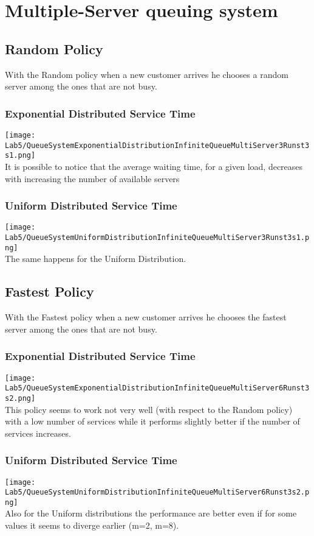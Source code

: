 \documentclass[twocolumn,letterpaper]{report}
\begin{document}
{	 			
	 			\section{Multiple-Server queuing system}
	 			\subsection{Random Policy}
	 			With the Random policy when a new customer arrives he chooses a random server among the ones that are not busy.
			 			\subsubsection{Exponential Distributed Service Time}
			 			\texttt{[image: Lab5/QueueSystemExponentialDistributionInfiniteQueueMultiServer3Runst3s1.png]} \\
		It is possible to notice that the average waiting time, for a given load, decreases with increasing the number of available servers
		
			 			\subsubsection{Uniform Distributed Service Time}
			 		\texttt{[image: Lab5/QueueSystemUniformDistributionInfiniteQueueMultiServer3Runst3s1.png]} \\
			 			The same happens for the Uniform Distribution.
			 			
			 	\subsection{Fastest Policy}
	 			With the Fastest policy when a new customer arrives he chooses the fastest server among the ones that are not busy.
			 			\subsubsection{Exponential Distributed Service Time}
			 			\texttt{[image: Lab5/QueueSystemExponentialDistributionInfiniteQueueMultiServer6Runst3s2.png]} \\
		This policy seems to work not very well (with respect to the Random policy) with a low number of services while it performs slightly better if the number of services increases.
		
								
			 			\subsubsection{Uniform Distributed Service Time}
			 		\texttt{[image: Lab5/QueueSystemUniformDistributionInfiniteQueueMultiServer6Runst3s2.png]} \\
			 			Also for the Uniform distributions the performance are better even if for some values it seems to diverge earlier (m=2, m=8).
			 			
}
\end{document}
